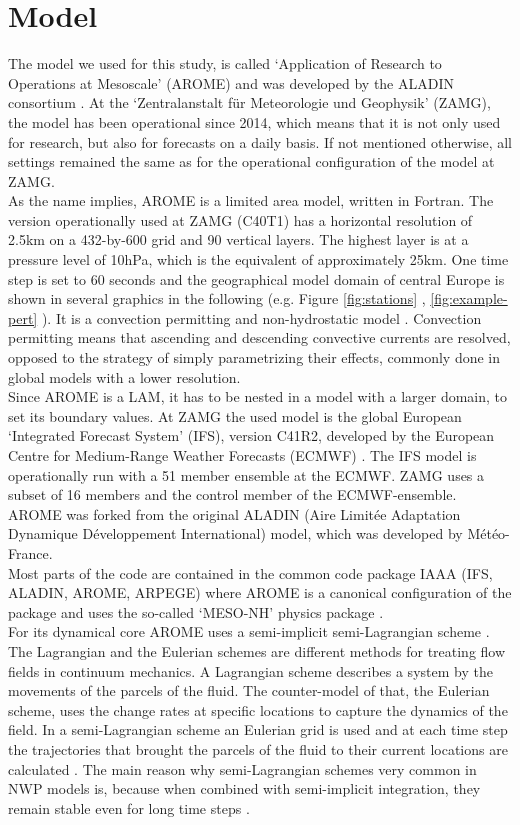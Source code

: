 \chapter{Model}
\label{sec:model}
The model we used for this study, is called `Application of Research to Operations at Mesoscale' (AROME) and was developed by the ALADIN consortium  \cite{aladinhp}. At the `Zentralanstalt für Meteorologie und Geophysik' (ZAMG), the model has been operational since 2014, which means that it is not only used for research, but also for forecasts on a daily basis.  If not mentioned otherwise, all settings remained the same as for the operational configuration of the model at ZAMG.\\
As the name implies, AROME is a limited area model, written in Fortran. The version operationally used at ZAMG (C40T1) has a horizontal resolution of 2.5km on a 432-by-600 grid and 90 vertical layers. The highest layer is at a pressure level of 10hPa, which is the equivalent of approximately 25km. One time step is set to  60 seconds and the geographical model domain of central Europe is shown in several graphics in the following (e.g. Figure \ref{fig:stations} , \ref{fig:example-pert} ). It is a convection permitting and non-hydrostatic model \cite{gmd-2017-103}. Convection permitting means that ascending and descending convective currents are resolved, opposed to the strategy of simply parametrizing their effects, commonly done in global models with a lower resolution.\\
Since AROME is a LAM, it has to be nested in a model with a larger domain, to set its boundary values. At ZAMG the used model is the global European `Integrated Forecast System' (IFS), version C41R2, developed by the European Centre for Medium-Range Weather Forecasts (ECMWF) \cite{IFS}. The IFS model is operationally run with a 51 member ensemble at the ECMWF. ZAMG uses a subset of 16 members and the control member of the ECMWF-ensemble. \\
AROME was forked from the original ALADIN (Aire Limitée Adaptation Dynamique Développement International) model, which was developed by Météo-France. \\
Most parts of the code are contained in the common code package IAAA (IFS, ALADIN, AROME, ARPEGE) where AROME is a canonical configuration of the package \parencite{gmd-2017-103} and uses the so-called `MESO-NH' physics package \parencite{lafore1998p}.\\
For its dynamical core AROME uses a semi-implicit semi-Lagrangian scheme \parencite{gmd-2017-103,seity2011arome}. The Lagrangian and the Eulerian schemes are different methods for treating flow fields in continuum mechanics. A Lagrangian scheme describes a system by the movements of the parcels of the fluid. The counter-model of that, the Eulerian scheme, uses the change rates at specific locations to capture the dynamics of the field. In a semi-Lagrangian scheme an Eulerian grid is used and at each time step the trajectories that brought the parcels of the fluid to their current locations are calculated \cite{durran2010numerical}. The main reason why semi-Lagrangian schemes very common in NWP models is, because when combined with semi-implicit integration, they remain stable even for long time steps \cite{vincent}. 


